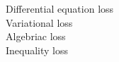 \documentclass[preview]{standalone}
\begin{document}
Differential equation loss\\Variational loss\\Algebriac loss\\Inequality loss\\
\end{document}
